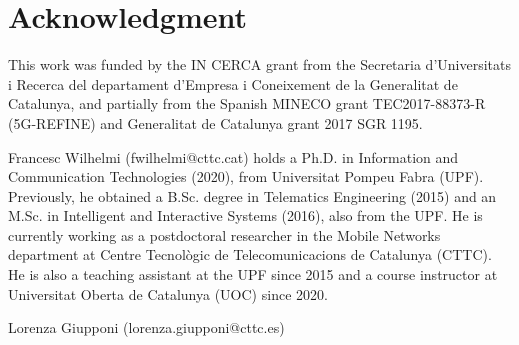\documentclass[journal]{IEEEtran}
\begin{document}
\section*{Acknowledgment}
This work was funded by the IN CERCA grant from the Secretaria d'Universitats i Recerca del departament d'Empresa i Coneixement de la Generalitat de Catalunya, and partially from the Spanish MINECO grant TEC2017-88373-R (5G-REFINE) and Generalitat de Catalunya grant 2017 SGR 1195.
	
\ifCLASSOPTIONcaptionsoff
\newpage
\fi
	



\begin{IEEEbiographynophoto}{Francesc Wilhelmi}
(fwilhelmi@cttc.cat) holds a Ph.D. in Information and Communication Technologies (2020), from Universitat Pompeu Fabra (UPF). Previously, he obtained a B.Sc. degree in Telematics Engineering (2015) and an M.Sc. in Intelligent and Interactive Systems (2016), also from the UPF. He is currently working as a postdoctoral researcher in the Mobile Networks department at Centre Tecnològic de Telecomunicacions de Catalunya (CTTC). He is also a teaching assistant at the UPF since 2015 and a course instructor at Universitat Oberta de Catalunya (UOC) since 2020.
\end{IEEEbiographynophoto}
%
\begin{IEEEbiographynophoto}{Lorenza Giupponi}
(lorenza.giupponi@cttc.es)
\end{IEEEbiographynophoto}
\end{document}
